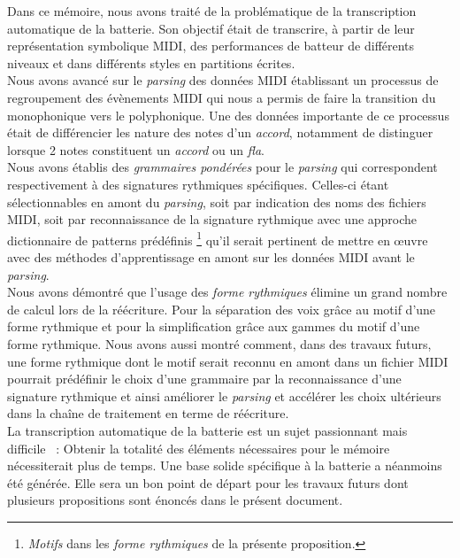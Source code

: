 Dans ce mémoire, nous avons traité de la problématique de la transcription
automatique de la batterie. Son objectif était de transcrire, à partir de leur
représentation symbolique MIDI, des performances de batteur de différents
niveaux et dans différents styles en partitions écrites.\\

Nous avons avancé sur le \textit{parsing} des données MIDI établissant un processus de
regroupement des évènements MIDI qui nous a permis de faire la transition du
monophonique vers le polyphonique. Une des données importante de ce processus
était de différencier les nature des notes d’un \textit{accord}, notamment de
distinguer lorsque 2 notes constituent un \textit{accord} ou un \textit{fla}.\\
Nous avons établis des \textit{grammaires pondérées} pour le \textit{parsing} qui
correspondent respectivement à des signatures rythmiques spécifiques. Celles-ci
étant sélectionnables en amont du \textit{parsing}, soit par indication des noms des
fichiers MIDI, soit par reconnaissance de la signature rythmique avec une approche dictionnaire de
patterns prédéfinis \footnote{\textit{Motifs} dans les \textit{forme rythmiques} de la
présente proposition.} qu’il serait pertinent de mettre en œuvre avec des
méthodes d’apprentissage en amont sur les données MIDI avant le \textit{parsing}.\\
Nous avons démontré que l’usage des \textit{forme rythmiques} élimine un grand nombre
de calcul lors de la réécriture. Pour la séparation des voix grâce au motif
d’une forme rythmique et pour la simplification grâce aux gammes du motif d’une forme rythmique.
Nous avons aussi montré comment, dans des travaux futurs, une forme rythmique dont le
motif serait reconnu en amont dans un fichier MIDI pourrait prédéfinir le choix
d’une grammaire par la reconnaissance d’une signature rythmique et ainsi améliorer le
\textit{parsing} et accélérer les choix ultérieurs dans la chaîne de traitement en terme
de réécriture.\\

La transcription automatique de la batterie est un sujet passionnant mais
difficile~ : Obtenir la totalité des éléments nécessaires pour le mémoire
nécessiterait plus de temps. Une base solide spécifique à la batterie a
néanmoins été générée. Elle sera un bon point de départ pour les travaux futurs
dont plusieurs propositions sont énoncés dans le présent document.
